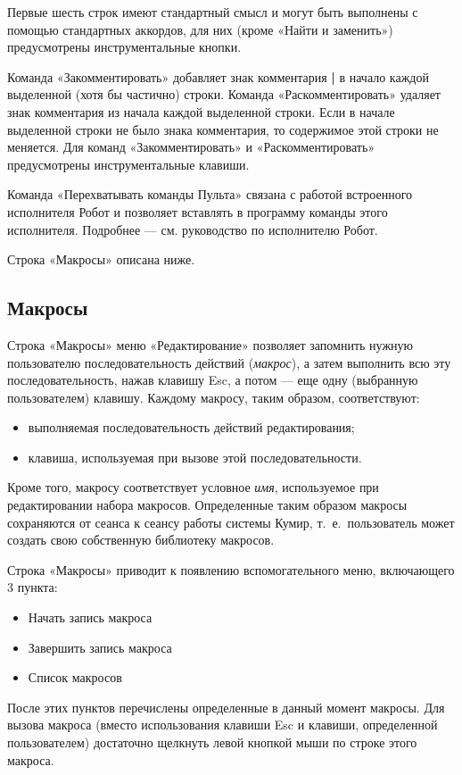 Первые шесть строк имеют стандартный смысл и могут быть выполнены с помощью стандартных аккордов, для них (кроме «Найти и заменить») предусмотрены инструментальные кнопки.

Команда «Закомментировать» добавляет знак комментария \textbf{\textsf{|}} в начало каждой выделенной (хотя бы частично) строки. Команда «Раскомментировать» удаляет знак комментария из начала каждой выделенной строки. Если в начале выделенной строки не было знака комментария, то содержимое этой строки не меняется. Для команд «Закомментировать» и «Раскомментировать» предусмотрены инструментальные клавиши.

Команда «Перехватывать команды Пульта» связана с работой встроенного исполнителя Робот и позволяет вставлять в программу команды этого исполнителя. Подробнее --- см. руководство по исполнителю Робот.

Строка «Макросы» описана ниже.

\subsection{Макросы}

Строка «Макросы» меню «Редактирование» позволяет запомнить нужную пользователю последовательность действий (\emph{макрос}), а затем выполнить всю эту последовательность, нажав клавишу \textsf{Esc}, а потом --- еще одну (выбранную пользователем) клавишу. Каждому макросу, таким образом, соответствуют:
\begin{itemize}
\item выполняемая последовательность действий редактирования;
\item клавиша, используемая при вызове этой последовательности.
\end{itemize}

Кроме того, макросу соответствует условное \emph{имя}, используемое при редактировании набора макросов. Определенные таким образом макросы сохраняются от сеанса к сеансу работы системы Кумир, т.~е.~пользователь может создать свою собственную библиотеку макросов. 

Строка «Макросы» приводит к появлению вспомогательного меню, включающего 3 пункта:
\begin{itemize}
\item Начать запись макроса
\item Завершить запись макроса
\item Список макросов
\end{itemize}

После этих пунктов перечислены определенные в данный момент макросы. Для вызова макроса (вместо использования клавиши \textsf{Esc} и клавиши, определенной пользователем) достаточно щелкнуть левой кнопкой мыши по строке этого макроса.

